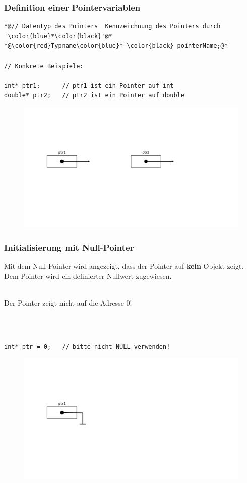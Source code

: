 \subsubsection{Definition einer Pointervariablen}
\label{sec:Definition einer Pointervariablen}
\noindent
\begin{minipage}{\linewidth}
\begin{lstlisting}
*@// Datentyp des Pointers	Kennzeichnung des Pointers durch '\color{blue}*\color{black}'@*
*@\color{red}Typname\color{blue}* \color{black} pointerName;@*

// Konkrete Beispiele:

int* ptr1;		// ptr1 ist ein Pointer auf int
double* ptr2;	// ptr2 ist ein Pointer auf double
\end{lstlisting}
\end{minipage}
\begin{figure}[h]
	\centering
	\includegraphics[width=0.5\linewidth]{images/pointer2.pdf}
\end{figure}

\subsubsection{Initialisierung mit Null-Pointer}
\label{sec_Initialisierung mit Null-Pointer}
Mit dem Null-Pointer wird angezeigt, dass der Pointer auf \textbf{kein} Objekt zeigt. Dem Pointer wird ein definierter Nullwert zugewiesen.\\
\\
\begin{hinweis}
Der Pointer zeigt nicht auf die Adresse 0!
\end{hinweis}
\\
\\
\noindent
\begin{minipage}{\linewidth}
\begin{lstlisting}
int* ptr = 0;	// bitte nicht NULL verwenden!
\end{lstlisting}
\end{minipage}
\begin{figure}[h]
	\centering
	\includegraphics[width=0.2\linewidth]{images/pointer3.pdf}
\end{figure}

